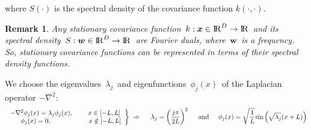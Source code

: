 \documentclass[landscape,a1,final]{a0poster} %
\newtheorem*{remark}{Remark}
\let\tempone\itemize
\let\temptwo\enditemize
\renewenvironment{itemize}{\tempone\addtolength{\itemsep}{-0.3\baselineskip}}{\temptwo}
\begin{document}
\begin{minipage}{1\linewidth}
\begin{minipage}[t]{0.31\textwidth}
\begin{itemize}
\item where $S(\cdot)$ is the {\color{navyblue}spectral density} of the covariance function $k(\cdot,\cdot)$.

\begin{remark}
Any stationary covariance function\, $k:\bm{x} \in {\rm I\!R}^{D} \to {\rm I\!R}$\, and its {\color{navyblue} spectral density}\, $S:\bm{w} \in {\rm I\!R}^{D} \to {\rm I\!R}$\, are Fourier duals, where\, $\bm{w}$\, is a frequency. So, stationary covariance functions can be represented in terms of their spectral density functions.
\end{remark}

\item We choose the {\color{navyblue} eigenvalues}\, $\lambda_j$\, and {\color{navyblue} eigenfunctions}\, $\phi_j(x)$\, of the Laplacian operator $-\nabla^2$:
%
\begin{align*}
\left. \begin{array}{cc}
 -\nabla^2 \phi_j(x) = \lambda_j \phi_j(x), \hspace{0.8cm}  x \in [-L,L] \\
\hspace{6mm} \phi_j(x) = 0, \hspace{2cm} x \notin [-L,L] 
\end{array} \right\} \; \Rightarrow \hspace{5mm} \lambda_j=\left(\frac{j\pi}{2L}\right)^2 \hspace{5mm} \text{and} \hspace{5mm}
\phi_j(x)=\sqrt{\frac{1}{L}} \text{sin}\left(\sqrt{\lambda_j}(x+L)\right)
\end{align*} 

%


\end{itemize}
\end{minipage}
\end{minipage}
\end{document}
